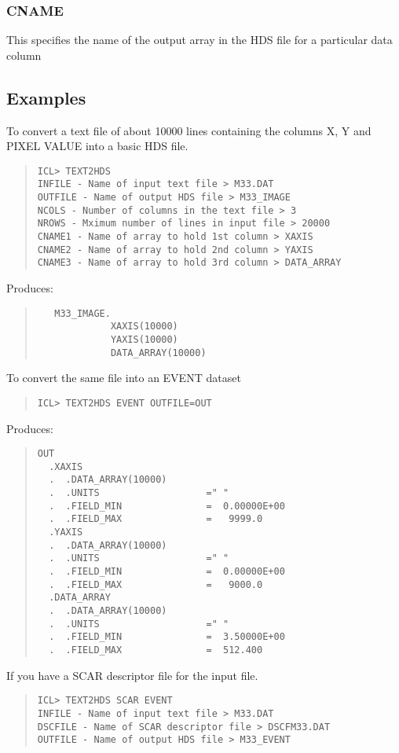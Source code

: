 \documentclass{book}
\renewcommand{\_}{{\tt\char'137}}     %
\begin{document}
\subsubsection{CNAME}
This specifies the name of the output array in the HDS file for
a particular data column
 
\subsection{Examples}
To convert a text file of about 10000 lines containing the columns
X, Y and PIXEL VALUE into a basic HDS file.
 
\begin{quote}\begin{verbatim}
ICL> TEXT2HDS
INFILE - Name of input text file > M33.DAT
OUTFILE - Name of output HDS file > M33_IMAGE
NCOLS - Number of columns in the text file > 3
NROWS - Mximum number of lines in input file > 20000
CNAME1 - Name of array to hold 1st column > XAXIS
CNAME2 - Name of array to hold 2nd column > YAXIS
CNAME3 - Name of array to hold 3rd column > DATA_ARRAY
\end{verbatim}\end{quote}
Produces:
\begin{quote}\begin{verbatim}
   M33_IMAGE.
             XAXIS(10000)
             YAXIS(10000)
             DATA_ARRAY(10000)
\end{verbatim}\end{quote}
To convert the same file into an EVENT dataset
\begin{quote}\begin{verbatim}
ICL> TEXT2HDS EVENT OUTFILE=OUT
\end{verbatim}\end{quote}
Produces:
\begin{quote}\begin{verbatim}
OUT                           
  .XAXIS                      
  .  .DATA_ARRAY(10000)       
  .  .UNITS                   =" "
  .  .FIELD_MIN               =  0.00000E+00
  .  .FIELD_MAX               =   9999.0
  .YAXIS                      
  .  .DATA_ARRAY(10000)       
  .  .UNITS                   =" "
  .  .FIELD_MIN               =  0.00000E+00
  .  .FIELD_MAX               =   9000.0
  .DATA_ARRAY                 
  .  .DATA_ARRAY(10000)       
  .  .UNITS                   =" "
  .  .FIELD_MIN               =  3.50000E+00
  .  .FIELD_MAX               =  512.400
\end{verbatim}\end{quote}
If you have a SCAR descriptor file for the input file.
\begin{quote}\begin{verbatim}
ICL> TEXT2HDS SCAR EVENT
INFILE - Name of input text file > M33.DAT
DSCFILE - Name of SCAR descriptor file > DSCFM33.DAT
OUTFILE - Name of output HDS file > M33_EVENT
\end{verbatim}\end{quote}
\end{document}
